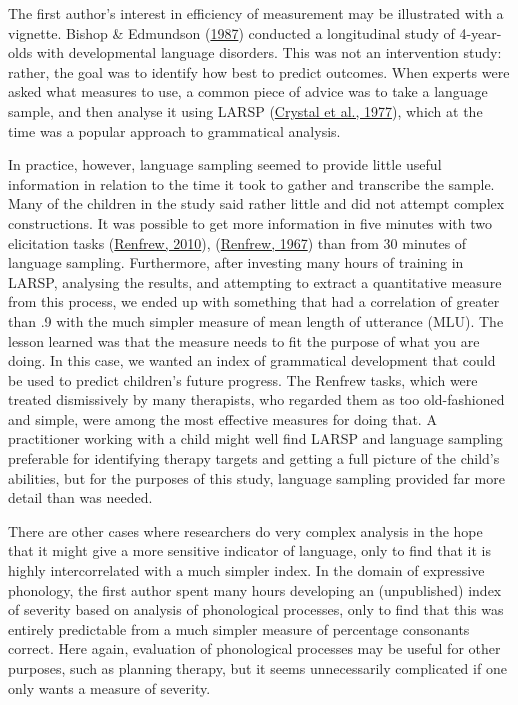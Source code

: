 \documentclass{krantz}
\begin{document}
The first author's interest in efficiency of measurement may be illustrated with a vignette. Bishop \& Edmundson (\protect\hyperlink{ref-bishop1987}{1987}) conducted a longitudinal study of 4-year-olds with developmental language disorders. This was not an intervention study: rather, the goal was to identify how best to predict outcomes. When experts were asked what measures to use, a common piece of advice was to take a language sample, and then analyse it using LARSP (\protect\hyperlink{ref-crystal1977}{Crystal et al., 1977}), which at the time was a popular approach to grammatical analysis.

In practice, however, language sampling seemed to provide little useful information in relation to the time it took to gather and transcribe the sample. Many of the children in the study said rather little and did not attempt complex constructions. It was possible to get more information in five minutes with two elicitation tasks (\protect\hyperlink{ref-renfrew2010}{Renfrew, 2010}), (\protect\hyperlink{ref-renfrew1967}{Renfrew, 1967}) than from 30 minutes of language sampling. Furthermore, after investing many hours of training in LARSP, analysing the results, and attempting to extract a quantitative measure from this process, we ended up with something that had a correlation of greater than .9 with the much simpler measure of mean length of utterance (MLU). The lesson learned was that the measure needs to fit the purpose of what you are doing. In this case, we wanted an index of grammatical development that could be used to predict children's future progress. The Renfrew tasks, which were treated dismissively by many therapists, who regarded them as too old-fashioned and simple, were among the most effective measures for doing that. A practitioner working with a child might well find LARSP and language sampling preferable for identifying therapy targets and getting a full picture of the child's abilities, but for the purposes of this study, language sampling provided far more detail than was needed.

There are other cases where researchers do very complex analysis in the hope that it might give a more sensitive indicator of language, only to find that it is highly intercorrelated with a much simpler index. In the domain of expressive phonology, the first author spent many hours developing an (unpublished) index of severity based on analysis of phonological processes, only to find that this was entirely predictable from a much simpler measure of percentage consonants correct. Here again, evaluation of phonological processes may be useful for other purposes, such as planning therapy, but it seems unnecessarily complicated if one only wants a measure of severity.
\end{document}
